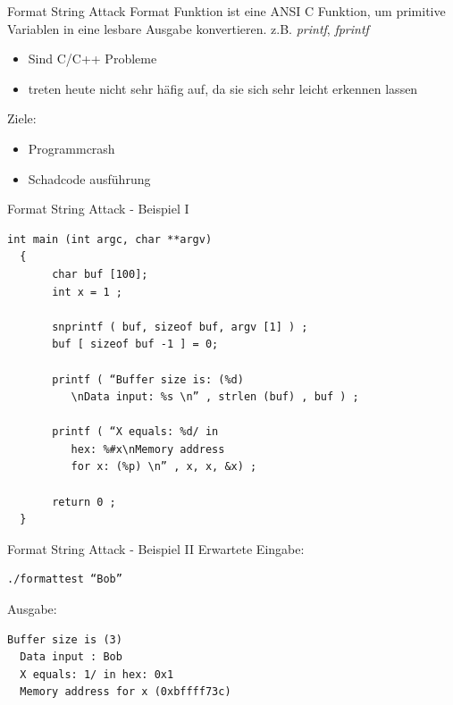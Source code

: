 \documentclass[10pt]{beamer}
\begin{document}
\begin{frame}[fragile]{Format String Attack}
  Format Funktion ist eine ANSI C Funktion, um primitive Variablen in eine lesbare Ausgabe konvertieren. z.B. \textit{printf}, \textit{fprintf}
  \begin{itemize}
    \item Sind C/C++ Probleme
    \item treten heute nicht sehr h\"afig auf, da sie sich sehr leicht erkennen lassen
  \end{itemize}

  Ziele:
  \begin{itemize}
    \item Programmcrash
    \item Schadcode ausf\"uhrung
  \end{itemize}
\end{frame}

\begin{frame}[fragile]{Format String Attack - Beispiel I}
  \begin{lstlisting}[style=CStyle]
  int main (int argc, char **argv)
  {
	   char buf [100];
	   int x = 1 ;

	   snprintf ( buf, sizeof buf, argv [1] ) ;
	   buf [ sizeof buf -1 ] = 0;

	   printf ( “Buffer size is: (%d)
          \nData input: %s \n” , strlen (buf) , buf ) ;

	   printf ( “X equals: %d/ in
          hex: %#x\nMemory address
          for x: (%p) \n” , x, x, &x) ;

	   return 0 ;
  }
  \end{lstlisting}
\end{frame}

\begin{frame}[fragile]{Format String Attack - Beispiel II}
  Erwartete Eingabe:
  \begin{lstlisting}[style=BashStyle]
  ./formattest “Bob”
  \end{lstlisting}

  Ausgabe:
  \begin{lstlisting}[style=BashStyle]
  Buffer size is (3)
  Data input : Bob
  X equals: 1/ in hex: 0x1
  Memory address for x (0xbffff73c)
  \end{lstlisting}
\end{frame}
\end{document}
